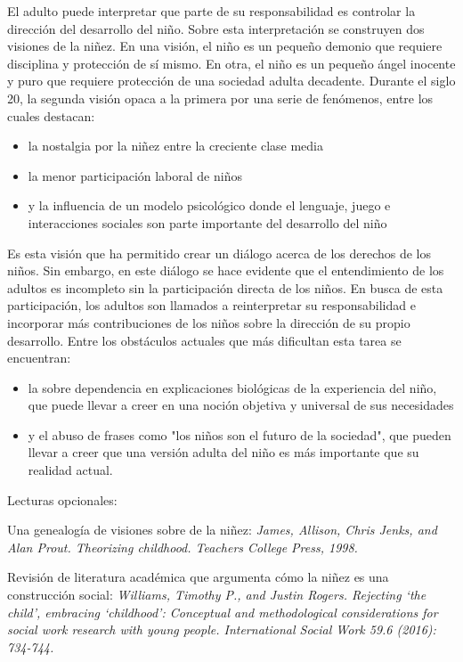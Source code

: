 \documentclass{tufte-handout}
\begin{document}
El adulto puede interpretar que parte de su responsabilidad es controlar la dirección del desarrollo del niño. Sobre esta interpretación se construyen dos visiones de la niñez. En una visión, el niño es un pequeño demonio que requiere disciplina y protección de sí mismo. En otra, el niño es un pequeño ángel inocente y puro que requiere protección de una sociedad adulta decadente. Durante el siglo 20, la segunda visión opaca a la primera por una serie de fenómenos, entre los cuales destacan:

\begin{itemize}
\item{la nostalgia por la niñez entre la creciente clase media}
\item{la menor participación laboral de niños}
\item{y la influencia de un modelo psicológico donde el lenguaje, juego e interacciones sociales son parte importante del desarrollo del niño}
\end{itemize}

Es esta visión que ha permitido crear un diálogo acerca de los derechos de los niños. Sin embargo, en este diálogo se hace evidente que el entendimiento de los adultos es incompleto sin la participación directa de los niños. En busca de esta participación, los adultos son llamados a reinterpretar su responsabilidad e incorporar más contribuciones de los niños sobre la dirección de su propio desarrollo. Entre los obstáculos actuales que más dificultan esta tarea se encuentran:

\begin{itemize}
\item{la sobre dependencia en explicaciones biológicas de la experiencia del niño, que puede llevar a creer en una noción objetiva y universal de sus necesidades}
\item{y el abuso de frases como "los niños son el futuro de la sociedad", que pueden llevar a creer que una versión adulta del niño es más importante que su realidad actual.}
\end{itemize}

\bigskip

Lecturas opcionales:

\bigskip

Una genealogía de visiones sobre de la niñez: \textit{James, Allison, Chris Jenks, and Alan Prout. Theorizing childhood. Teachers College Press, 1998.}

\bigskip

Revisión de literatura académica que argumenta cómo la niñez es una construcción social: \textit{Williams, Timothy P., and Justin Rogers. Rejecting ‘the child’, embracing ‘childhood’: Conceptual and methodological considerations for social work research with young people. International Social Work 59.6 (2016): 734-744.}
\end{document}
